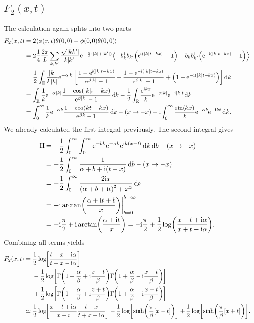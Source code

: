 \documentclass[english, parskip=full]{scrartcl}
\begin{document}
\subsection{$F_2(x,t)$}
The calculation again splits into two parts
\begin{align}
F_2(x,t) &= 2\bra*{\phi(x,t)\theta(0,0) - \phi(0,0)\theta(0,0)}\\
&= 2 \frac{1}{4} \frac{2\pi}{L} \sum_{k,k'} \frac{\sqrt{|kk'|}}{k|k'|} \powe{-\frac{\alpha}{2} (|k|+|k'|)} \bra*{-b_k^\dagger b_{k'} \kla*{\powe{\i (|k|t - kx)} - 1} - b_k b_{k'}^\dagger \kla*{\powe{-\i (|k|t - kx)} - 1}}\\
&= \frac{1}{2} \intr{\frac{|k|}{k|k|} \powe{-\alpha |k|} \klb*{\frac{1-\powe{\i (|k|t - kx)}}{\powe{\beta |k|} - 1} + \frac{1-\powe{-\i (|k|t - kx)}}{\powe{\beta |k|} - 1} + \kla*{1 - \powe{-\i (|k|t - kx)}}}}{k}\\
&= \intr{\frac{1}{k} \powe{-\alpha |k|} \frac{1 - \cos\kla*{|k|t - kx}}{\powe{\beta |k|} - 1}}{k} - \frac{1}{2} \intr{\frac{\powe{\i kx}}{k} \powe{-\alpha |k|} \powe{-\i |k| t}}{k}\\
&= \intx{0}{\infty}{\frac{1}{k} \powe{-\alpha k} \frac{1 - \cos(kt-kx)}{\powe{\beta k} - 1}}{k} - (x\rightarrow -x) - \i \intx{0}{\infty}{\frac{\sin(kx)}{k} \powe{-\alpha k} \powe{-\i kt}}{k}.
\end{align}
We already calculated the first integral previously.
The second integral gives
\begin{align}
\text{II} &= -\frac{1}{2} \intx{0}{\infty}{\intx{0}{\infty}{\powe{-bk} \powe{-\alpha k} \powe{\i k(x-t)}}{k}}{b} - (x\rightarrow -x)\\
&= -\frac{1}{2} \intx{0}{\infty}{\frac{1}{\alpha + b + \i (t-x)}}{b} - (x\rightarrow - x)\\
&= -\frac{1}{2} \intx{0}{\infty}{\frac{2\i x}{\kla*{\alpha + b + \i t}^2 + x^2}}{b}\\
&= -\i \arctan\kla*{\frac{\alpha + \i t + b}{x}}\bigg\vert_{b=0}^{b=\infty}\\
&= -\i \frac{\pi}{2} + \i \arctan\kla*{\frac{\alpha + \i t}{x}} = -\i\frac{\pi}{2} + \frac{1}{2} \log\kla*{\frac{x - t + \i\alpha}{x + t - \i\alpha}}.
\end{align}
Combining all terms yields
\begin{align}
F_2(x,t) &= \bsplit{&\frac{1}{2} \log\klb*{\frac{t-x - \i\alpha}{t+x - \i\alpha}} \\
&- \frac{1}{2} \log \klb[\bigg]{\Gamma\kla*{1 + \frac{\alpha}{\beta} + \i \frac{x-t}{\beta}} \Gamma\kla*{1 + \frac{\alpha}{\beta} - \i \frac{x-t}{\beta}}}\\
&+ \frac{1}{2} \log \klb[\bigg]{\Gamma\kla*{1 + \frac{\alpha}{\beta} + \i \frac{x+t}{\beta}} \Gamma\kla*{1 + \frac{\alpha}{\beta} - \i \frac{x+t}{\beta}}}}\\
&\simeq \frac{1}{2} \log\klb*{\frac{x-t + \i\alpha}{x-t} \frac{t+x}{t+x - \i\alpha}} - \frac{1}{2} \log \klb*{\sinh\kla*{\frac{\pi}{\beta} [x-t]}} + \frac{1}{2} \log \klb*{\sinh\kla*{\frac{\pi}{\beta} [x+t]}}.
\end{align}
\end{document}

